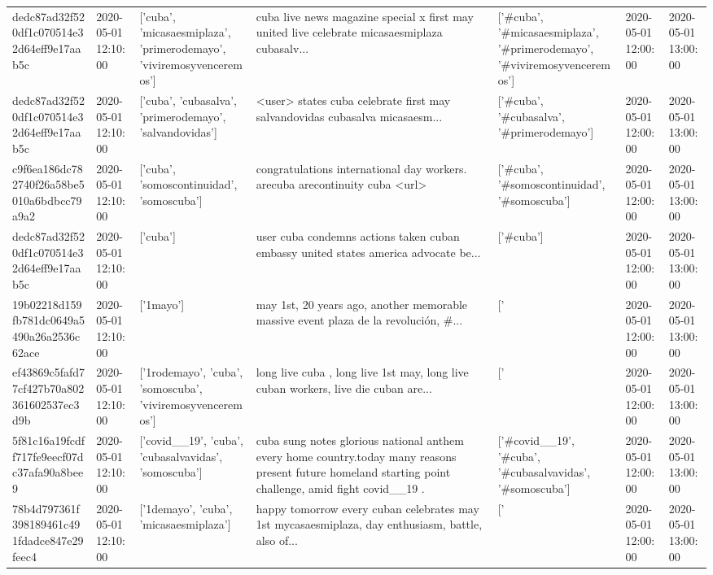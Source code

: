\begin{tabular}{lllllll}
dedc87ad32f520df1c070514e32d64eff9e17aab5c & 2020-05-01 12:10:00 & ['cuba', 'micasaesmiplaza', 'primerodemayo', 'viviremosyvenceremos'] & cuba live news magazine special x first may united live celebrate micasaesmiplaza cubasalv... & ['#cuba', '#micasaesmiplaza', '#primerodemayo', '#viviremosyvenceremos'] & 2020-05-01 12:00:00 & 2020-05-01 13:00:00 \\
dedc87ad32f520df1c070514e32d64eff9e17aab5c & 2020-05-01 12:10:00 & ['cuba', 'cubasalva', 'primerodemayo', 'salvandovidas'] & <user> states cuba celebrate first may salvandovidas cubasalva micasaesm... & ['#cuba', '#cubasalva', '#primerodemayo'] & 2020-05-01 12:00:00 & 2020-05-01 13:00:00 \\
c9f6ea186dc782740f26a58be5010a6bdbcc79a9a2 & 2020-05-01 12:10:00 & ['cuba', 'somoscontinuidad', 'somoscuba'] & congratulations international day workers. arecuba arecontinuity cuba <url> & ['#cuba', '#somoscontinuidad', '#somoscuba'] & 2020-05-01 12:00:00 & 2020-05-01 13:00:00 \\
dedc87ad32f520df1c070514e32d64eff9e17aab5c & 2020-05-01 12:10:00 & ['cuba'] & user cuba condemns actions taken cuban embassy united states america advocate be... & ['#cuba'] & 2020-05-01 12:00:00 & 2020-05-01 13:00:00 \\
19b02218d159fb781dc0649a5490a26a2536c62ace & 2020-05-01 12:10:00 & ['1mayo'] & may 1st, 20 years ago, another memorable massive event plaza de la revolución, \#... & ['#1mayo'] & 2020-05-01 12:00:00 & 2020-05-01 13:00:00 \\
ef43869c5fafd77cf427b70a802361602537ec3d9b & 2020-05-01 12:10:00 & ['1rodemayo', 'cuba', 'somoscuba', 'viviremosyvenceremos'] & long live cuba , long live 1st may, long live cuban workers, live die cuban are... & ['#1rodemayo', '#cuba', '#somoscuba', '#viviremosyvenceremos'] & 2020-05-01 12:00:00 & 2020-05-01 13:00:00 \\
5f81c16a19fcdff717fe9eecf07dc37afa90a8bee9 & 2020-05-01 12:10:00 & ['covid__19', 'cuba', 'cubasalvavidas', 'somoscuba'] & cuba sung notes glorious national anthem every home country.today many reasons present future homeland starting point challenge, amid fight covid\_\_19 . & ['#covid__19', '#cuba', '#cubasalvavidas', '#somoscuba'] & 2020-05-01 12:00:00 & 2020-05-01 13:00:00 \\
78b4d797361f398189461c491fdadce847e29feec4 & 2020-05-01 12:10:00 & ['1demayo', 'cuba', 'micasaesmiplaza'] & happy tomorrow every cuban celebrates may 1st mycasaesmiplaza, day enthusiasm, battle, also of... & ['#1demayo', '#cuba', '#micasaesmiplaza'] & 2020-05-01 12:00:00 & 2020-05-01 13:00:00 \\

\end{tabular}
